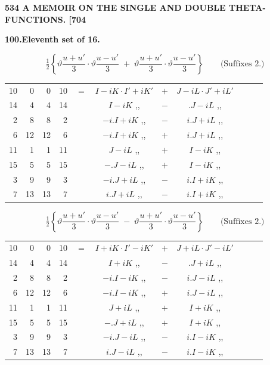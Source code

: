 \documentclass[11pt]{article}
\newcommand{\half}{\tfrac{1}{2}}
\begin{document}
\newpage
\noindent\textbf{534 \hfill A MEMOIR ON THE SINGLE AND DOUBLE THETA-FUNCTIONS. \hfill [704}

\medskip
\begin{center}\textbf{100.\quad Eleventh set of 16.}\end{center}

\[
\half\!\left\{\vartheta\frac{u+u'}{3}\cdot\vartheta\frac{u-u'}{3}\;+\;\vartheta\frac{u+u'}{3}\cdot\vartheta\frac{u-u'}{3}\right\}\qquad\text{(Suffixes 2.)}
\]
{\small
\begin{center}
\begin{tabular}{rrrrr@{\ }c@{\ }lcr@{\ }c@{\ }l}
10 & 0  & 0  & 10 & $=$ & $I-iK\cdot I'+iK'$ & $+$ & $J-iL\cdot J'+iL'$ \\
14 & 4  & 4  & 14 & & $I-iK$ \quad ,, & $-$ & $.J-iL$ \quad ,, \\
2  & 8  & 8  & 2  & & $-i.I+iK$ \quad ,, & $-$ & $i.J+iL$ \quad ,, \\
6  & 12 & 12 & 6  & & $-i.I+iK$ \quad ,, & $+$ & $i.J+iL$ \quad ,, \\
11 & 1  & 1  & 11 & & $J-iL$ \quad ,, & $+$ & $I-iK$ \quad ,, \\
15 & 5  & 5  & 15 & & $-.J-iL$ \quad ,, & $+$ & $I-iK$ \quad ,, \\
3  & 9  & 9  & 3  & & $-i.J+iL$ \quad ,, & $-$ & $i.I+iK$ \quad ,, \\
7  & 13 & 13 & 7  & & $i.J+iL$ \quad ,, & $-$ & $i.I+iK$ \quad ,, \\
\end{tabular}
\end{center}
}

\[
\half\!\left\{\vartheta\frac{u+u'}{3}\cdot\vartheta\frac{u-u'}{3}\;-\;\vartheta\frac{u+u'}{3}\cdot\vartheta\frac{u-u'}{3}\right\}\qquad\text{(Suffixes 2.)}
\]
{\small
\begin{center}
\begin{tabular}{rrrrr@{\ }c@{\ }lcr@{\ }c@{\ }l}
10 & 0  & 0  & 10 & $=$ & $I+iK\cdot I'-iK'$ & $+$ & $J+iL\cdot J'-iL'$ \\
14 & 4  & 4  & 14 & & $I+iK$ \quad ,, & $-$ & $.J+iL$ \quad ,, \\
2  & 8  & 8  & 2  & & $-i.I-iK$ \quad ,, & $-$ & $i.J-iL$ \quad ,, \\
6  & 12 & 12 & 6  & & $-i.I-iK$ \quad ,, & $+$ & $i.J-iL$ \quad ,, \\
11 & 1  & 1  & 11 & & $J+iL$ \quad ,, & $+$ & $I+iK$ \quad ,, \\
15 & 5  & 5  & 15 & & $-.J+iL$ \quad ,, & $+$ & $I+iK$ \quad ,, \\
3  & 9  & 9  & 3  & & $-i.J-iL$ \quad ,, & $-$ & $i.I-iK$ \quad ,, \\
7  & 13 & 13 & 7  & & $i.J-iL$ \quad ,, & $-$ & $i.I-iK$ \quad ,, \\
\end{tabular}
\end{center}
}
\end{document}
